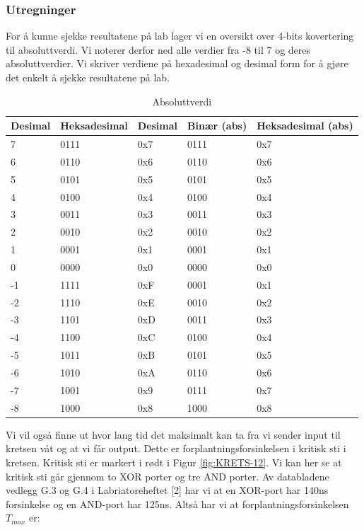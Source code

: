 \documentclass{article}
\begin{document}
\subsubsection{Utregninger} %
For å kunne sjekke resultatene på lab lager vi en oversikt over 4-bits kovertering til absoluttverdi. Vi noterer derfor ned alle verdier fra -8 til 7 og deres absoluttverdier. Vi skriver verdiene på hexadesimal og desimal form for å gjøre det enkelt å sjekke resultatene på lab.

\begin{table}[h]
	\centering
	\caption{Absoluttverdi}
	\label{tab:abs1}
	\vspace{0.2cm}
	\begin{tabular} {| l | l | l || l | l |} \hline
		Desimal & Heksadesimal & Desimal & Binær (abs) & Heksadesimal (abs) \\ \hline
		7 & 0111 & 0x7 & 0111 & 0x7 \\ \hline
		6 & 0110 & 0x6 & 0110 & 0x6 \\ \hline
		5 & 0101 & 0x5 & 0101 & 0x5 \\ \hline
		4 & 0100 & 0x4 & 0100 & 0x4 \\ \hline
		3 & 0011 & 0x3 & 0011 & 0x3 \\ \hline
		2 & 0010 & 0x2 & 0010 & 0x2 \\ \hline
		1 & 0001 & 0x1 & 0001 & 0x1 \\ \hline
		0 & 0000 & 0x0 & 0000 & 0x0 \\ \hline
		-1 & 1111 & 0xF & 0001 & 0x1 \\ \hline
		-2 & 1110 & 0xE & 0010 & 0x2 \\ \hline
		-3 & 1101 & 0xD & 0011 & 0x3 \\ \hline
		-4 & 1100 & 0xC & 0100 & 0x4 \\ \hline
		-5 & 1011 & 0xB & 0101 & 0x5 \\ \hline
		-6 & 1010 & 0xA & 0110 & 0x6 \\ \hline
		-7 & 1001 & 0x9 & 0111 & 0x7 \\ \hline
		-8 & 1000 & 0x8 & 1000 & 0x8 \\ \hline
	\end{tabular}
\end{table}

Vi vil også finne ut hvor lang tid det maksimalt kan ta fra vi sender input til kretsen våt og at vi får output. Dette er forplantningsforsinkelsen i kritisk sti i kretsen. Kritisk sti er markert i rødt i Figur \ref{fig:KRETS-12}. Vi kan her se at kritisk sti går gjennom to XOR porter og tre AND porter. Av databladene vedlegg G.3 og G.4 i Labriatoreheftet [2] har vi at en XOR-port har 140ns forsinkelse og en AND-port har 125ns. Altså har vi at forplantningsforsinkelsen \begin{math} T_{max} \end{math} er:
\end{document}
